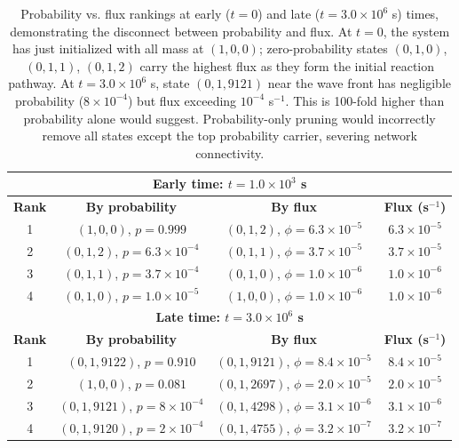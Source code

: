 \documentclass[onefignum,onetabnum]{siamart171218}
\begin{document}
\begin{table}[htbp]
\centering
\caption{Probability vs. flux rankings at early ($t=0$) and late ($t=3.0\times10^6$ s) times, demonstrating the disconnect between probability and flux. At $t=0$, the system has just initialized with all mass at $(1,0,0)$; zero-probability states $(0,1,0)$, $(0,1,1)$, $(0,1,2)$ carry the highest flux as they form the initial reaction pathway. At $t=3.0\times10^6$ s, state $(0,1,9121)$ near the wave front has negligible probability ($8\times10^{-4}$) but flux exceeding $10^{-4}$ s$^{-1}$. This is 100-fold higher than probability alone would suggest. Probability-only pruning would incorrectly remove all states except the top probability carrier, severing network connectivity.}
\label{tab:prob_flux_rankings}
\begin{tabular}{cccc}
\hline
\multicolumn{4}{c}{\textbf{Early time: $t = 1.0 \times 10^3$ s}} \\
\hline
\textbf{Rank} & \textbf{By probability} & \textbf{By flux} & \textbf{Flux (s$^{-1}$)} \\
\hline
1 & $(1,0,0)$, $p=0.999$ & $(0,1,2)$, $\phi=6.3\times10^{-5}$ & $6.3\times10^{-5}$ \\
2 & $(0,1,2)$, $p=6.3 \times 10^{-4}$ & $(0,1,1)$, $\phi=3.7\times10^{-5}$ & $3.7\times10^{-5}$ \\
3 & $(0,1,1)$, $p=3.7 \times 10^{-4}$ & $(0,1,0)$, $\phi=1.0\times10^{-6}$ & $1.0\times10^{-6}$ \\
4 & $(0,1,0)$, $p=1.0 \times 10^{-5}$ & $(1,0,0)$, $\phi=1.0\times10^{-6}$ & $1.0\times10^{-6}$ \\
\hline
\multicolumn{4}{c}{\textbf{Late time: $t = 3.0 \times 10^6$ s}} \\
\hline
\textbf{Rank} & \textbf{By probability} & \textbf{By flux} & \textbf{Flux (s$^{-1}$)} \\
\hline
1 & $(0,1,9122)$, $p=0.910$ & $(0,1,9121)$, $\phi=8.4\times10^{-5}$ & $8.4\times10^{-5}$ \\
2 & $(1,0,0)$, $p=0.081$ & $(0,1,2697)$, $\phi=2.0\times10^{-5}$ & $2.0\times10^{-5}$ \\
3 & $(0,1,9121)$, $p=8\times10^{-4}$ & $(0,1,4298)$, $\phi=3.1\times10^{-6}$ & $3.1\times10^{-6}$ \\
4 & $(0,1,9120)$, $p=2\times10^{-4}$ & $(0,1,4755)$, $\phi=3.2\times10^{-7}$ & $3.2\times10^{-7}$ \\
\hline
\end{tabular}
\end{table}
\end{document}
